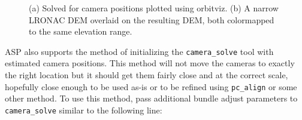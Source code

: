 \begin{figure}[h!]
\centering
  \hfil
\caption{(a) Solved for camera positions plotted using orbitviz.  (b) A narrow LRONAC DEM overlaid on the resulting DEM, both colormapped to the same elevation range.}
\label{fig:pinhole-a15-result-image}
\end{figure}

ASP also supports the method of initializing the \texttt{camera\_solve} tool with estimated
camera positions.  This method will not move the cameras to exactly the right location but
it should get them fairly close and at the correct scale, hopefully close enough
to be used as-is or to be refined using \texttt{pc\_align} or some other method.
To use this method, pass additional bundle adjust parameters to \texttt{camera\_solve} similar to the following line:


